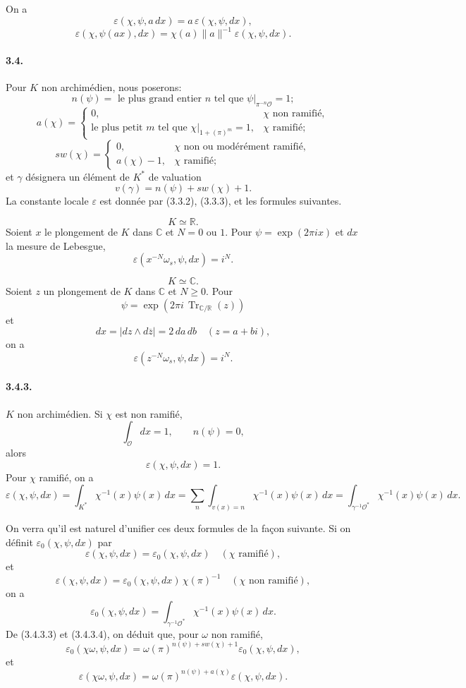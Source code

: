 \documentclass[10pt]{article}
\newcommand{\C}{\mathbb C}
\newcommand{\Tr}{\operatorname{Tr}}
\providecommand{\R}{\mathbb R}
\begin{document}
On a
\[
\tag{3.3.2}
\varepsilon(\chi,\psi,a\,dx)=a\,\varepsilon(\chi,\psi,dx),
\]
\[
\tag{3.3.3}
\varepsilon(\chi,\psi(ax),dx)=\chi(a)\|a\|^{-1}\varepsilon(\chi,\psi,dx).
\]

\paragraph{3.4.} Pour \(K\) non archimédien, nous poserons:
\[
n(\psi)=\text{ le plus grand entier }n\text{ tel que }\psi|_{\pi^{-n}\mathcal O}=1;
\]
\[
a(\chi)=
\begin{cases}
0,&\chi\text{ non ramifié},\\
\text{le plus petit }m\text{ tel que }\chi|_{1+(\pi)^m}=1,&\chi\text{ ramifié};
\end{cases}
\]
\[
sw(\chi)=
\begin{cases}
0,&\chi\text{ non ou modérément ramifié},\\
a(\chi)-1,&\chi\text{ ramifié};
\end{cases}
\]
et \(\gamma\) désignera un élément de \(K^*\) de valuation
\[
v(\gamma)=n(\psi)+sw(\chi)+1.
\]
La constante locale \(\varepsilon\) est donnée par (3.3.2), (3.3.3), et les formules suivantes.

\[
\tag{3.4.1}
K\simeq\R.
\]
Soient \(x\) le plongement de \(K\) dans \(\C\) et \(N=0\) ou \(1\). Pour \(\psi=\exp(2\pi ix)\) et \(dx\) la mesure de Lebesgue,
\[
\varepsilon(x^{-N}\omega_s,\psi,dx)=i^N.
\]

\[
\tag{3.4.2}
K\simeq\C.
\]
Soient \(z\) un plongement de \(K\) dans \(\C\) et \(N\ge0\). Pour
\[
\psi=\exp(2\pi i\,\Tr_{\C/\R}(z))
\]
et
\[
dx=|dz\wedge d\overline z|=2\,da\,db\quad(z=a+bi),
\]
on a
\[
\varepsilon(z^{-N}\omega_s,\psi,dx)=i^N.
\]

\paragraph{3.4.3.} \(K\) non archimédien. Si \(\chi\) est non ramifié,
\[
\int_{\mathcal O}dx=1,\qquad n(\psi)=0,
\]
alors
\[
\tag{3.4.3.1}
\varepsilon(\chi,\psi,dx)=1.
\]
Pour \(\chi\) ramifié, on a
\[
\tag{3.4.3.2}
\varepsilon(\chi,\psi,dx)=
\int_{K^*}\chi^{-1}(x)\psi(x)\,dx
=
\sum_n\int_{v(x)=n}\chi^{-1}(x)\psi(x)\,dx
=
\int_{\gamma^{-1}\mathcal O^*}\chi^{-1}(x)\psi(x)\,dx.
\]

On verra qu'il est naturel d'unifier ces deux formules de la façon suivante. Si on définit \(\varepsilon_0(\chi,\psi,dx)\) par
\[
\varepsilon(\chi,\psi,dx)=\varepsilon_0(\chi,\psi,dx)
\quad(\chi\text{ ramifié}),
\]
et
\[
\tag{3.4.3.3}
\varepsilon(\chi,\psi,dx)=\varepsilon_0(\chi,\psi,dx)\,\chi(\pi)^{-1}
\quad(\chi\text{ non ramifié}),
\]
on a
\[
\tag{3.4.3.4}
\varepsilon_0(\chi,\psi,dx)=
\int_{\gamma^{-1}\mathcal O^*}\chi^{-1}(x)\psi(x)\,dx.
\]
De (3.4.3.3) et (3.4.3.4), on déduit que, pour \(\omega\) non ramifié,
\[
\tag{3.4.3.5}
\varepsilon_0(\chi\omega,\psi,dx)
=
\omega(\pi)^{n(\psi)+sw(\chi)+1}\varepsilon_0(\chi,\psi,dx),
\]
et
\[
\varepsilon(\chi\omega,\psi,dx)
=
\omega(\pi)^{n(\psi)+a(\chi)}\varepsilon(\chi,\psi,dx).
\]
\end{document}
